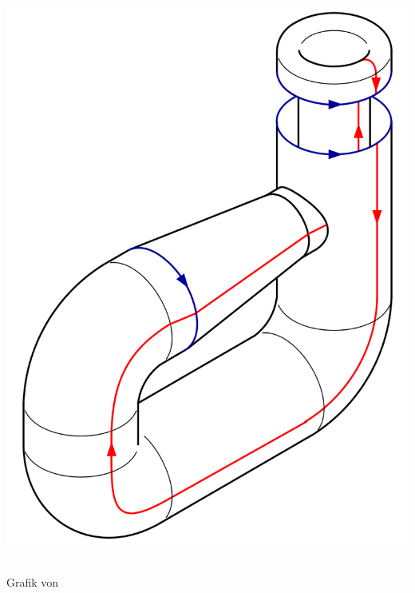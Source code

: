 \begin{example}
\begin{enumerate}[1)]
\begin{minipage}{\textwidth}
\begin{minipage}{0.3\textwidth}
                    \includegraphics[width=\textwidth]{figures/800px-Klein_Bottle_Folding_6.svg.png}
                \end{minipage}
                \\
 \scriptsize Grafik von \cite{img:klein-bottle-folding} \\
                \begin{minipage}{\textwidth}
                    \centering
                \end{minipage}
            \end{minipage}


\end{enumerate}
\end{example}
